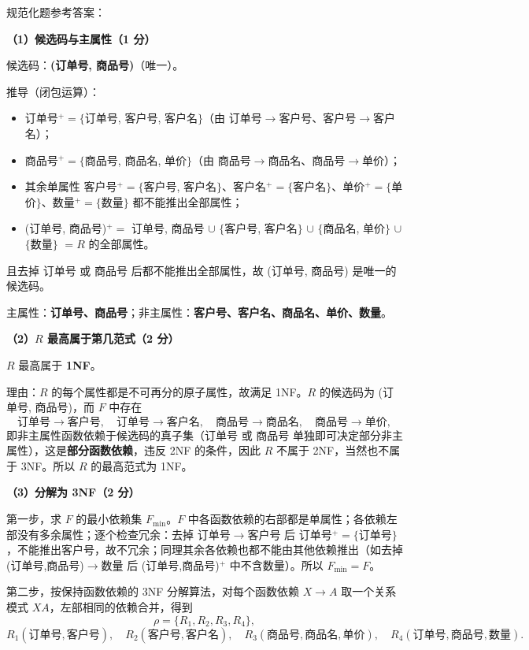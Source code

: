 \documentclass[a4paper,11pt]{article}
\begin{document}
\q 规范化题参考答案：

\textbf{（1）候选码与主属性（1 分）}

候选码：\textbf{(订单号, 商品号)}（唯一）。

推导（闭包运算）：
\begin{itemize}[leftmargin=1.6em, itemsep=1pt]
  \item 订单号$^{+}=\{$订单号, 客户号, 客户名$\}$（由 订单号$\to$客户号、客户号$\to$客户名）；
  \item 商品号$^{+}=\{$商品号, 商品名, 单价$\}$（由 商品号$\to$商品名、商品号$\to$单价）；
  \item 其余单属性 客户号$^{+}=\{$客户号, 客户名$\}$、客户名$^{+}=\{$客户名$\}$、单价$^{+}=\{$单价$\}$、数量$^{+}=\{$数量$\}$ 都不能推出全部属性；
  \item (订单号, 商品号)$^{+}=$ 订单号, 商品号 $\cup$ $\{$客户号, 客户名$\}$ $\cup$ $\{$商品名, 单价$\}$ $\cup$ $\{$数量$\}$ $=R$ 的全部属性。
\end{itemize}
且去掉 订单号 或 商品号 后都不能推出全部属性，故 (订单号, 商品号) 是唯一的候选码。

主属性：\textbf{订单号、商品号}；非主属性：\textbf{客户号、客户名、商品名、单价、数量}。

\textbf{（2）$R$ 最高属于第几范式（2 分）}

$R$ 最高属于 \textbf{1NF}。

理由：$R$ 的每个属性都是不可再分的原子属性，故满足 1NF。$R$ 的候选码为 (订单号, 商品号)，而 $F$ 中存在
\[
\text{订单号}\to\text{客户号},\quad \text{订单号}\to\text{客户名},\quad
\text{商品号}\to\text{商品名},\quad \text{商品号}\to\text{单价},
\]
即非主属性函数依赖于候选码的真子集（订单号 或 商品号 单独即可决定部分非主属性），这是\textbf{部分函数依赖}，违反 2NF 的条件，因此 $R$ 不属于 2NF，当然也不属于 3NF。所以 $R$ 的最高范式为 1NF。

\textbf{（3）分解为 3NF（2 分）}

第一步，求 $F$ 的最小依赖集 $F_{\min}$。$F$ 中各函数依赖的右部都是单属性；各依赖左部没有多余属性；逐个检查冗余：去掉 订单号$\to$客户号 后 订单号$^{+}=\{$订单号$\}$，不能推出客户号，故不冗余；同理其余各依赖也都不能由其他依赖推出（如去掉 (订单号,商品号)$\to$数量 后 (订单号,商品号)$^{+}$ 中不含数量）。所以 $F_{\min}=F$。

第二步，按保持函数依赖的 3NF 分解算法，对每个函数依赖 $X\to A$ 取一个关系模式 $XA$，左部相同的依赖合并，得到
\[
\rho=\{R_1, R_2, R_3, R_4\},
\]
\[
R_1(\text{订单号},\text{客户号}),\quad
R_2(\text{客户号},\text{客户名}),\quad
R_3(\text{商品号},\text{商品名},\text{单价}),\quad
R_4(\text{订单号},\text{商品号},\text{数量}).
\]
\end{document}
